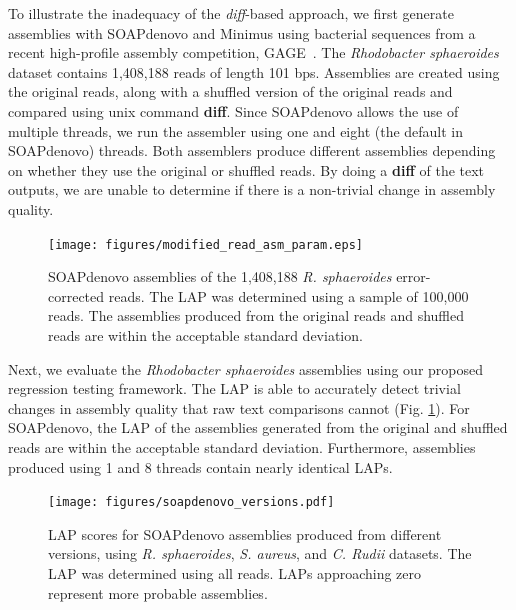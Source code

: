 \documentclass[12pt,\mydriver]{thesis}
\begin{document}
To illustrate the inadequacy of the \emph{diff}-based approach, we first generate assemblies with SOAPdenovo and Minimus using bacterial sequences from a recent high-profile assembly competition, GAGE~\cite{salzberg2011gage}.
The \emph{Rhodobacter sphaeroides} dataset contains 1,408,188 reads of length 101 bps.
Assemblies are created using the original reads, along with a shuffled version of the original reads and compared using unix command \textbf{diff}.
Since SOAPdenovo allows the use of multiple threads, we run the assembler using one and eight (the default in SOAPdenovo) threads.
Both assemblers produce different assemblies depending on whether they use the original or shuffled reads.
By doing a \textbf{diff} of the text outputs, we are unable to determine if there is a non-trivial change in assembly quality.



\begin{figure}[!tb]\begin{center}
  \texttt{[image: figures/modified\_read\_asm\_param.eps]}
\end{center}
\renewcommand{\baselinestretch}{1}
\small\normalsize
\begin{quote}
\caption[LAP scores for original and shuffled \emph{R. sphaeroides} dataset]{SOAPdenovo assemblies of the 1,408,188 \emph{R. sphaeroides} error-corrected reads.  The LAP was determined using a sample of 100,000 reads.  The assemblies produced from the original reads and shuffled reads are within the acceptable standard deviation.}
\label{fig:modified_read_asm_param}
\end{quote}
\end{figure}
\renewcommand{\baselinestretch}{2}
\small\normalsize

Next, we evaluate the \emph{Rhodobacter sphaeroides} assemblies using our proposed regression testing framework.
The LAP is able to accurately detect trivial changes in assembly quality that raw text comparisons cannot (Fig. \ref{fig:modified_read_asm_param}).
For SOAPdenovo, the LAP of the assemblies generated from the original and shuffled reads are within the acceptable standard deviation.  Furthermore, assemblies produced using 1 and 8 threads contain nearly identical LAPs.

\begin{figure}[!tb]\begin{center}
  \texttt{[image: figures/soapdenovo\_versions.pdf]}
\end{center}
\renewcommand{\baselinestretch}{1}
\small\normalsize
\begin{quote}
  \caption[LAP scores for SOAPdenovo assemblies across various versions]{LAP scores for SOAPdenovo assemblies produced from different versions, using \emph{R. sphaeroides}, \emph{S. aureus}, and \emph{C. Rudii} datasets.
    The LAP was determined using all reads.  LAPs approaching zero represent more probable assemblies.
    }
  \label{fig:soapdenovo_versions}
\end{quote}
\end{figure}
\renewcommand{\baselinestretch}{2}
\small\normalsize
\end{document}
